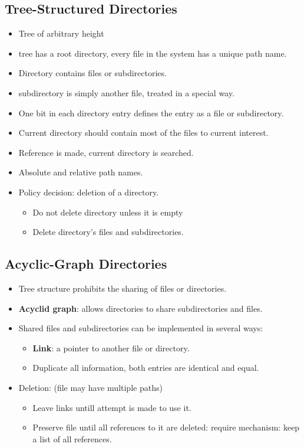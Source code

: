\documentclass[10pt]{report}
\begin{document}
		\subsection{Tree-Structured Directories}
			\begin{itemize}
					\item Tree of arbitrary height
					\item tree has a root directory, every file in the system has a unique path name.
					\item Directory contains files or subdirectories.
					\item subdirectory is simply another file, treated in a special way.
					\item One bit in each directory entry defines the entry as a file or subdirectory.
					\item Current directory should contain most of the files to current interest.
					\item Reference is made, current directory is searched.
					\item Absolute and relative path names.
					\item Policy decision: deletion of a directory.
					\begin{itemize}
							\item Do not delete directory unless it is empty
							\item Delete directory's files and subdirectories.
					\end{itemize}
			\end{itemize}

		\subsection{Acyclic-Graph Directories}
			\begin{itemize}
					\item Tree structure prohibits the sharing of files or directories.
					\item \textbf{Acyclid graph}: allows directories to share subdirectories and files.
					\item Shared files and subdirectories can be implemented in several ways:
					\begin{itemize}
							\item \textbf{Link}: a pointer to another file or directory.
							\item Duplicate all information, both entries are identical and equal.
					\end{itemize}
					\item Deletion: (file may have multiple paths)
					\begin{itemize}
							\item Leave links untill attempt is made to use it.
							\item Preserve file until all references to it are deleted: require mechanism: keep a list of all references.
					\end{itemize}
			\end{itemize}
\end{document}
